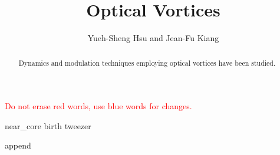 \documentclass[journal]{IEEEtran}
\begin{document}
%

\title{Optical Vortices} \label{I}

\author{Yueh-Sheng Hsu and Jean-Fu Kiang
}


\maketitle 


\begin{abstract}
Dynamics and modulation techniques employing optical vortices have been studied.
\end{abstract}

\textcolor{red}{Do not erase red words, use blue words for changes.}

{near_core}
{birth}
{tweezer}

\nocite{*}



{append}
\end{document}
